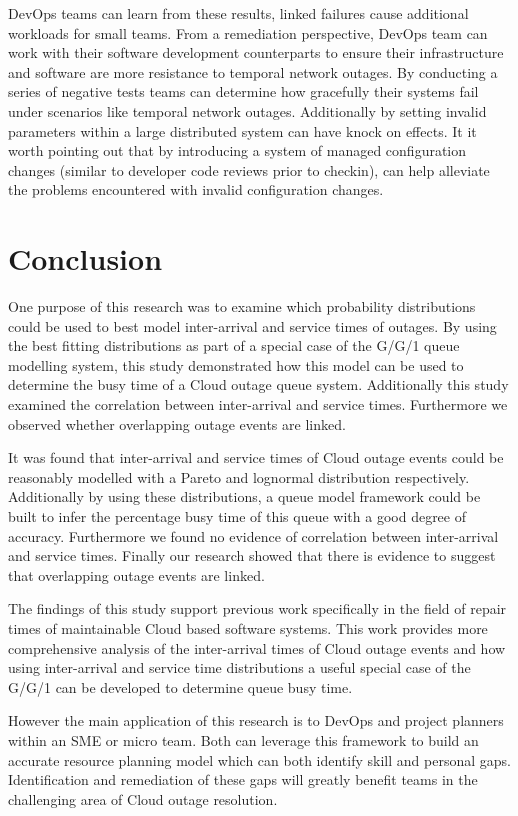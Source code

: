 \documentclass[5p]{elsarticle}
\begin{document}
DevOps teams can learn from these results, linked failures cause additional workloads for small teams. From a remediation perspective, DevOps team can work with their software development counterparts to ensure their infrastructure and software are more resistance to temporal network outages. By conducting a series of negative tests teams can determine how gracefully their systems fail under scenarios like temporal network outages. Additionally by setting invalid parameters within a large distributed system can have knock on effects. It it worth pointing out that by introducing a system of managed configuration changes (similar to developer code reviews prior to checkin), can help alleviate the problems encountered with invalid configuration changes.

\section{Conclusion}

One purpose of this research was to examine which probability distributions could be used to best model inter-arrival and service times of outages. By using the best fitting distributions as part of a special case of the G/G/1 queue modelling system, this study demonstrated how this model can be used to determine the busy time of a Cloud outage queue system. Additionally this study examined the correlation between inter-arrival and service times. Furthermore we observed whether overlapping outage events are  linked.

It was found that inter-arrival and service times of Cloud outage events could be reasonably modelled with a Pareto and lognormal distribution respectively. Additionally by using these distributions, a queue model framework could be built to infer the percentage busy time of this queue with a good degree of accuracy. Furthermore we found no evidence of correlation between inter-arrival and service times. Finally our research showed that there is evidence to suggest that overlapping outage events are linked.

The findings of this study support previous work specifically in the field of repair times of maintainable Cloud based software systems. This work provides  more comprehensive analysis of the inter-arrival times of Cloud outage events and how using inter-arrival and service time distributions a useful special case of the G/G/1 can be developed to determine queue busy time. 

However the main application of this research is to DevOps and project planners within an SME or micro team. Both can leverage this framework to build an accurate resource planning model which can both identify skill and personal gaps. Identification and remediation of these gaps will greatly benefit teams in the challenging area of Cloud outage resolution.
\end{document}
